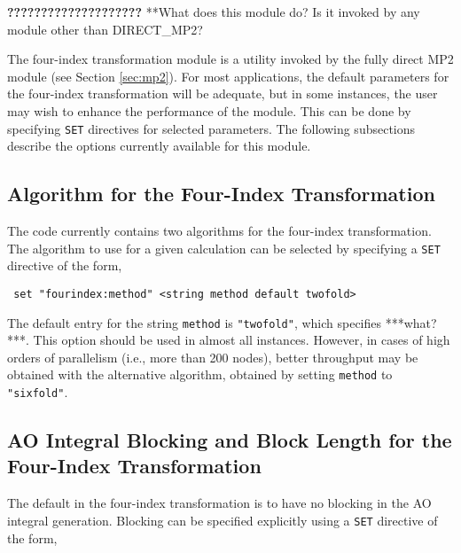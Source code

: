\label{sec:fourindex}

{\bf ????????????????????}
\Large
**What does this module do?  Is it invoked by any module other than
DIRECT\_MP2?
\normalsize


The four-index transformation module is a utility invoked by the fully
direct MP2 module (see Section \ref{sec:mp2}).  For most applications,
the default parameters for the four-index transformation will be adequate,
but in some instances, the user may wish to enhance the performance of
the module.  This can be done by specifying \verb+SET+ directives for
selected parameters.  The following subsections describe the options
currently available for this module.

\subsection{Algorithm for the Four-Index Transformation}

The code currently contains two algorithms for the four-index transformation.
The algorithm to use for a given calculation can be selected by specifying
a \verb+SET+ directive of the form,

\begin{verbatim}
 set "fourindex:method" <string method default twofold>
\end{verbatim}

The default entry for the string \verb+method+ is \verb+"twofold"+, which
specifies ***what?***.  This option should be used in almost all instances.
However, in cases of high orders of parallelism (i.e., more than 200 nodes),
 better throughput may be obtained with the alternative algorithm, 
obtained by setting \verb+method+ to \verb+"sixfold"+.

\subsection{AO Integral Blocking and Block Length for the Four-Index Transformation}

The default in the four-index transformation is to have no blocking in
the AO integral generation.  Blocking can be specified explicitly using a
\verb+SET+ directive of the form,


